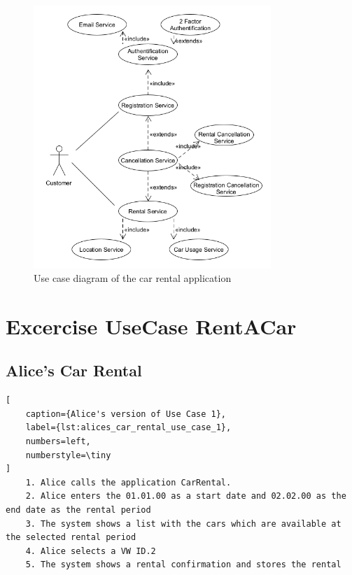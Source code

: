 \begin{figure}
    \centering
    \includegraphics[width=0.8\textwidth]{figures/goLang/carRental/carRental_umlDiagram.png}
    \caption{Use case diagram of the car rental application}
    \label{fig:car_rental_use_case_diagram}
\end{figure}

\section{Excercise UseCase RentACar}

\subsection*{Alice's Car Rental}
\begin{lstlisting}[
    caption={Alice's version of Use Case 1},
    label={lst:alices_car_rental_use_case_1},
    numbers=left,
    numberstyle=\tiny
]
    1. Alice calls the application CarRental.
    2. Alice enters the 01.01.00 as a start date and 02.02.00 as the end date as the rental period
    3. The system shows a list with the cars which are available at the selected rental period
    4. Alice selects a VW ID.2
    5. The system shows a rental confirmation and stores the rental
\end{lstlisting}
